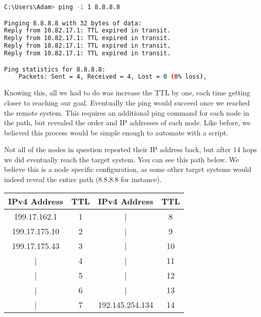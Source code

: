 \documentclass[prb,preprint]{revtex4-1}
\begin{document}
\vspace{5mm}

\begin{lstlisting}[language=bash]
C:\Users\Adam> ping -i 1 8.8.8.8

Pinging 8.8.8.8 with 32 bytes of data:
Reply from 10.82.17.1: TTL expired in transit.
Reply from 10.82.17.1: TTL expired in transit.
Reply from 10.82.17.1: TTL expired in transit.
Reply from 10.82.17.1: TTL expired in transit.

Ping statistics for 8.8.8.8:
    Packets: Sent = 4, Received = 4, Lost = 0 (0% loss),
\end{lstlisting}

\vspace{5mm}

Knowing this, all we had to do was increase the TTL by one, each time getting closer to reaching our goal. Eventually the ping would succeed once we reached the remote system. This requires an additional ping command for each node in the path, but revealed the order and IP addresses of each node. Like before, we believed this process would be simple enough to automate with a script.

Not all of the nodes in question reported their IP address back, but after 14 hops we did eventually reach the target system. You can see this path below. We believe this is a node specific configuration, as some other target systems would indeed reveal the entire path (8.8.8.8 for instance).

\vspace{2mm}


\begin{center}
    \begin{tabular}{||c|c||c|c||}
        \hline
        IPv4 Address & TTL & IPv4 Address & TTL \\
        \hline
        199.17.162.1  & 1  &    | & 8  \\
        \hline
        199.17.175.10 & 2    &  | & 9  \\
        \hline
        199.17.175.43 & 3   &   | & 10 \\
        \hline
        | & 4  & | & 11 \\
        \hline
        | & 5  &    | & 12 \\
        \hline
        | & 6  &  | & 13 \\
        \hline
        | & 7  &    192.145.254.134 & 14 \\
        \hline
    \end{tabular}
\end{center}
\end{document}
